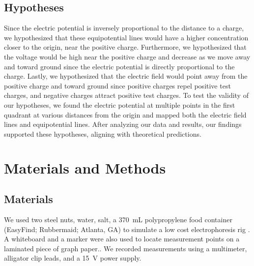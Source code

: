 \documentclass[10pt,journal,twoside]{IEEEtran}
\begin{document}
\subsection{Hypotheses}
Since the electric potential is inversely proportional to the distance to a charge, we hypothesized that these equipotential lines would have a higher concentration closer to the origin, near the positive charge. Furthermore, we hypothesized that the voltage would be high near the positive charge and decrease as we move away and toward ground since the electric potential is directly proportional to the charge. Lastly, we hypothesized that the electric field would point away from the positive charge and toward ground since positive charges repel positive test charges, and negative charges attract positive test charges. To test the validity of our hypotheses, we found the electric potential at multiple points in the first quadrant at various distances from the origin and mapped both the electric field lines and equipotential lines. After analyzing our data and results, our findings supported these hypotheses, aligning with theoretical predictions.





\section{Materials and Methods}
\subsection{Materials}
We used two steel nuts, water, salt, a \qty{370}{\milli\liter} polypropylene food container (EasyFind; Rubbermaid; Atlanta, GA) to simulate a low cost electrophoresis rig \cite{campbell}. A whiteboard and a marker were also used to locate measurement points on a laminated piece of graph paper.. We recorded measurements using a multimeter, alligator clip leads, and a \qty{15}{\volt} power supply.  
\end{document}
